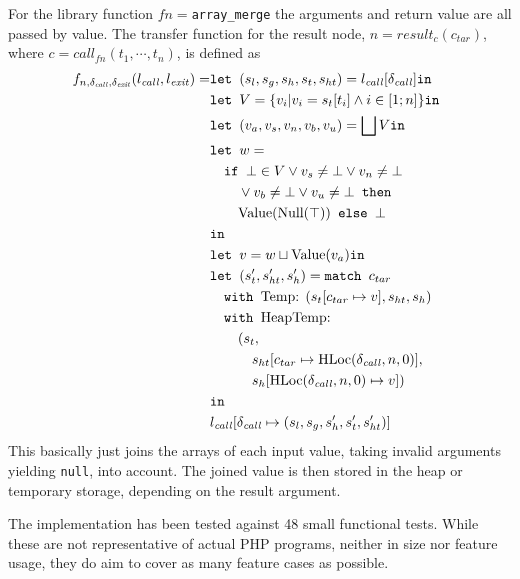 For the library function $fn = $\texttt{array\_merge}  the arguments and return value are all passed by value. The transfer function for the result node, $n = \mathit{result}_{c}(c_{\mathit{tar}})$, where $c = \mathit{call}_{{fn}}(t_1,\cdots, t_n)$, is defined as 
\begin{align*}
f_{n,\delta_{\mathit{call}},\delta_{\mathit{exit}}}(l_{\mathit{call}}, l_{\mathit{exit}}) = 	&\texttt{let } (s_l, s_g, s_h, s_t, s_{ht}) = l_{\mathit{call}}[\delta_{\mathit{call}}] \texttt{in }\notag\\
																							&\texttt{let } V =  \{v_i| v_i = s_t[t_i]\wedge i \in [1;n]\} \texttt{in }\notag\\
																							&\texttt{let } (v_a,v_s, v_n, v_b, v_u) = \bigsqcup V \texttt{in }\notag\\
																							&\texttt{let } w =  \notag\\
																							&\quad\texttt{if }\bot \in V \vee v_s \neq \bot \vee v_n \neq \bot\notag\\
																							&\quad\quad \vee v_b \neq \bot \vee v_u \neq \bot\texttt{ then } \notag\\
																							&\quad\quad\text{Value}(\text{Null}(\top)) \texttt{ else } \bot\notag\\
																							& \texttt{in }\notag\\
																							&\texttt{let } v = w \sqcup \text{Value}(v_a) \texttt{in }\notag\\
																							&\texttt{let } (s_t', s_{ht}',s_h') = \texttt{match }c_{tar}\notag\\
																							&\quad\texttt{with }\text{Temp}\text{: } (s_t[c_{tar}\mapsto v], s_{ht}, s_h)\notag\\
																							&\quad\texttt{with }\text{HeapTemp}\text{: }\notag\\
																							&\quad\quad(s_t, \notag\\
																							&\quad\quad\quad s_{ht}[c_{tar}\mapsto \text{HLoc}(\delta_{\mathit{call}}, n, 0)], \notag\\
																							&\quad\quad\quad s_h[\text{HLoc}(\delta_{\mathit{call}}, n, 0)\mapsto v])\notag\\
																							& \texttt{in }\notag\\
																							&l_{\mathit{call}}[\delta_{\mathit{call}}\mapsto (s_l, s_g, s_h', s_t', s_{ht}')]
\end{align*} 
This basically just joins the arrays of each input value, taking invalid arguments yielding \texttt{null}, into account. The joined value is then stored in the heap or temporary storage, depending on the result argument.

The implementation has been tested against 48 small functional tests. While these are not representative of actual PHP programs, neither in size nor feature usage, they do aim to cover as many feature cases as possible.

